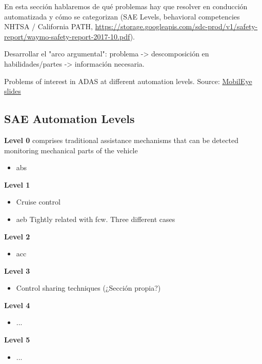 

En esta sección hablaremos de qué problemas hay que resolver en conducción automatizada y cómo se categorizan (SAE Levels, behavioral competencies NHTSA / California PATH, \url{https://storage.googleapis.com/sdc-prod/v1/safety-report/waymo-safety-report-2017-10.pdf}).

Desarrollar el "arco argumental": problema -> descomposición en habilidades/partes -> información necesaria.

Problems of interest in ADAS at different automation levels.
Source: \href{http://www.mobileye.com/wp-content/uploads/2013/09/AEB_test_procedures_aug12.pdf}{MobilEye slides}

\subsection{SAE Automation Levels}

\textbf{Level 0} comprises traditional assistance mechanisms that can be detected monitoring mechanical parts of the vehicle
\begin{itemize}[leftmargin=20mm,labelsep=5.8mm]
    \item	\gls{abs}
\end{itemize}

\textbf{Level 1}
\begin{itemize}[leftmargin=20mm,labelsep=5.8mm]
    \item	Cruise control
    \item	\gls{aeb} Tightly related with \gls{fcw}. Three different cases
\end{itemize}

\textbf{Level 2}
\begin{itemize}[leftmargin=20mm,labelsep=5.8mm]
    \item   \gls{acc}
\end{itemize}

\textbf{Level 3}
\begin{itemize}[leftmargin=20mm,labelsep=5.8mm]
    \item Control sharing techniques (¿Sección propia?)
\end{itemize}

\textbf{Level 4}
\begin{itemize}[leftmargin=20mm,labelsep=5.8mm]
    \item	...
\end{itemize}

\textbf{Level 5}
\begin{itemize}[leftmargin=20mm,labelsep=5.8mm]
    \item	...
\end{itemize}


